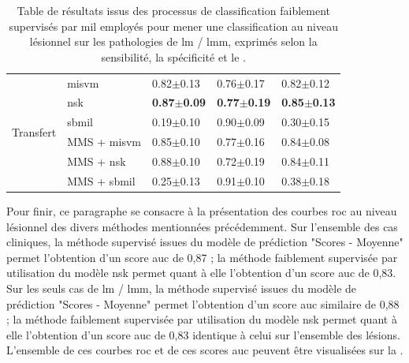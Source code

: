 \begin{table}[H]
\begin{tabular}{cllll}
        \multirow{6}{*}{Transfert}   & \gls{misvm}              & 0.82$\pm$0.13             & 0.76$\pm$0.17             & 0.82$\pm$0.12             \\
                                     & \gls{nsk}                & \textbf{0.87$\pm$0.09}    & \textbf{0.77$\pm$0.19}    & \textbf{0.85$\pm$0.13}    \\
                                     & \gls{sbmil}              & 0.19$\pm$0.10             & 0.90$\pm$0.09             & 0.30$\pm$0.15             \\
                                     & MMS + \gls{misvm}        & 0.85$\pm$0.10             & 0.77$\pm$0.16             & 0.84$\pm$0.08             \\
                                     & MMS + \gls{nsk}          & 0.88$\pm$0.10             & 0.72$\pm$0.19             & 0.84$\pm$0.11             \\
                                     & MMS + \gls{sbmil}        & 0.25$\pm$0.13             & 0.91$\pm$0.10             & 0.38$\pm$0.18             \\ \bottomrule
    \end{tabular}
    \caption{Table de résultats issus des processus de classification faiblement supervisés par \gls{mil} employés pour mener une classification au niveau lésionnel sur les pathologies de \gls{lm} / \gls{lmm}, exprimés selon la sensibilité, la spécificité et le \fscore{}.}
    \label{tab:results_lesion_classification_weakly_patient_lm}
\end{table}

Pour finir, ce paragraphe se consacre à la présentation des courbes \gls{roc} au niveau lésionnel des divers méthodes mentionnées précédemment. Sur l'ensemble des cas cliniques, la méthode supervisé issues du modèle de prédiction "Scores - Moyenne" permet l'obtention d'un score \gls{auc} de 0,87 ; la méthode faiblement supervisée par utilisation du modèle \gls{nsk} permet quant à elle l'obtention d'un score \gls{auc} de 0,83. Sur les seuls cas de \gls{lm} / \gls{lmm}, la méthode supervisé issues du modèle de prédiction "Scores - Moyenne" permet l'obtention d'un score \gls{auc} similaire de 0,88 ; la méthode faiblement supervisée par utilisation du modèle \gls{nsk} permet quant à elle l'obtention d'un score \gls{auc} de 0,83 identique à celui sur l'ensemble des lésions. L'ensemble de ces courbes \gls{roc} et de ces scores \gls{auc} peuvent être visualisées sur la .\par

